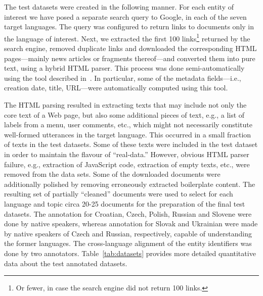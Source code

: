 \documentclass[11pt]{article}
\begin{document}
The test datasets were created in the following manner.  For each entity
of interest we have posed a separate search query to Google, in each of
the seven target languages.  The query was configured to return links to
documents only in the language of interest.  Next, we extracted the first
100 links\footnote{Or fewer, in case the search engine did not return 100
  links.} returned by the search engine, removed duplicate links and
downloaded the corresponding HTML pages---mainly news articles or
fragments thereof---and converted them into pure text, using a hybrid
HTML parser.  This process was done semi-automatically using the tool
described in~\cite{Crawley:ea:2010}.  In particular, some of the metadata
fields---i.e., creation date, title, URL---were automatically computed
using this tool.


The HTML parsing resulted in extracting texts that may include not only
the core text of a Web page, but also some additional pieces of text,
e.g., a list of labels from a menu, user comments, etc., which might not
necessarily constitute well-formed utterances in the target language.
This occurred in a small fraction of texts in the test datasets.  Some of
these texts were included in the test dataset in order to maintain the
flavour of ``real-data.''  However, obvious HTML parser failure, e.g.,
extraction of JavaScript code, extraction of empty texts, etc., were removed
from the data sets.  Some of the downloaded documents were
additionally polished by removing erroneously extracted boilerplate
content.  The resulting set of partially ``cleaned'' documents were used to
select for each language and topic circa 20-25 documents for the
preparation of the final test datasets.  The annotation for Croatian,
Czech, Polish, Russian and Slovene were done by native speakers, whereas
annotation for Slovak and Ukrainian were made by native speakers of Czech
and Russian, respectively, capable of understanding the former
languages.  The cross-language alignment of the entity identifiers was
done by two annotators.  Table~\ref{tab:datasets} provides more detailed
quantitative data about the test annotated datasets.
\end{document}
